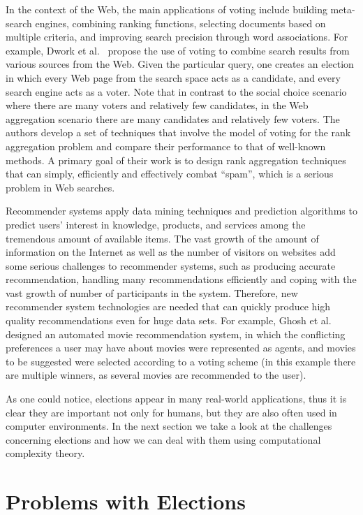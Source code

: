 In the context of the Web, the main applications of voting include building meta-search engines, combining ranking functions, selecting documents based on multiple criteria, and improving search precision through word associations.
For example, Dwork et al.\ \cite{dwork} propose the use of voting to combine search results from various sources from the Web.
Given the particular query, one creates an election in which every Web page from the search space acts as a candidate, and every search engine acts as a voter.
Note that in contrast to the social choice scenario where there are many voters and relatively few candidates, in the Web aggregation scenario there are many candidates and relatively few voters.
The authors develop a set of techniques that involve the model of voting for the rank aggregation problem and compare their performance to that of well-known methods.
A primary goal of their work is to design rank aggregation techniques that can simply, efficiently and effectively combat ``spam'', which is a serious problem in Web searches.

Recommender systems apply data mining techniques and prediction algorithms to predict users' interest in knowledge, products, and services among the tremendous amount of available items.
The vast growth of the amount of information on the Internet as well as the number of visitors on websites add some serious challenges to recommender systems, such as producing accurate recommendation, handling many re\-com\-men\-da\-tions efficiently and coping with the vast growth of number of participants in the system.
Therefore, new recommender system technologies are needed that can quickly produce high quality recommendations even for huge data sets.
For example, Ghosh et al.\ \cite{ghosh} designed an automated movie recommendation system, in which the conflicting preferences a user may have about movies were represented as agents, and movies to be suggested were selected according to a voting scheme (in this example there are multiple winners, as several movies are recommended to the user).

As one could notice, elections appear in many real-world applications, thus it is clear they are important not only for humans, but they are also often used in computer environments.
In the next section we take a look at the challenges concerning elections and how we can deal with them using computational complexity theory.

\section{Problems with Elections} \label{sec:problems}

